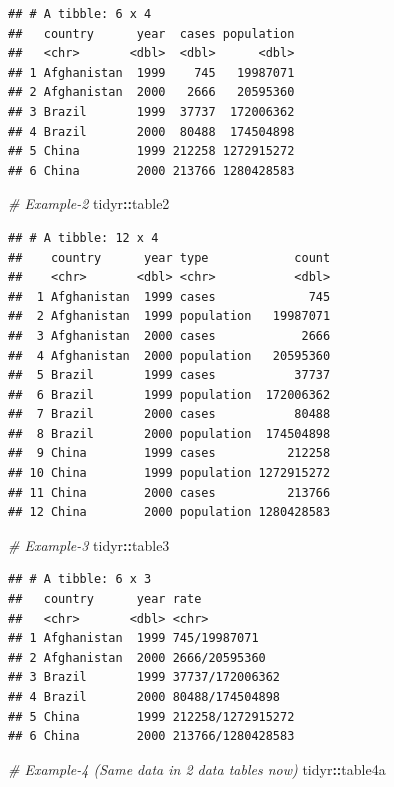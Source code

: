 \documentclass[
]{book}
\newenvironment{Shaded}{\begin{snugshade}}{\end{snugshade}}
\newcommand{\CommentTok}[1]{\textcolor[rgb]{0.56,0.35,0.01}{\textit{#1}}}
\newcommand{\NormalTok}[1]{#1}
\newcommand{\SpecialCharTok}[1]{\textcolor[rgb]{0.81,0.36,0.00}{\textbf{#1}}}
\begin{document}
\begin{verbatim}
## # A tibble: 6 x 4
##   country      year  cases population
##   <chr>       <dbl>  <dbl>      <dbl>
## 1 Afghanistan  1999    745   19987071
## 2 Afghanistan  2000   2666   20595360
## 3 Brazil       1999  37737  172006362
## 4 Brazil       2000  80488  174504898
## 5 China        1999 212258 1272915272
## 6 China        2000 213766 1280428583
\end{verbatim}

\begin{Shaded}
\begin{Highlighting}[]
\CommentTok{\# Example{-}2}
\NormalTok{tidyr}\SpecialCharTok{::}\NormalTok{table2}
\end{Highlighting}
\end{Shaded}

\begin{verbatim}
## # A tibble: 12 x 4
##    country      year type            count
##    <chr>       <dbl> <chr>           <dbl>
##  1 Afghanistan  1999 cases             745
##  2 Afghanistan  1999 population   19987071
##  3 Afghanistan  2000 cases            2666
##  4 Afghanistan  2000 population   20595360
##  5 Brazil       1999 cases           37737
##  6 Brazil       1999 population  172006362
##  7 Brazil       2000 cases           80488
##  8 Brazil       2000 population  174504898
##  9 China        1999 cases          212258
## 10 China        1999 population 1272915272
## 11 China        2000 cases          213766
## 12 China        2000 population 1280428583
\end{verbatim}

\begin{Shaded}
\begin{Highlighting}[]
\CommentTok{\# Example{-}3}
\NormalTok{tidyr}\SpecialCharTok{::}\NormalTok{table3}
\end{Highlighting}
\end{Shaded}

\begin{verbatim}
## # A tibble: 6 x 3
##   country      year rate             
##   <chr>       <dbl> <chr>            
## 1 Afghanistan  1999 745/19987071     
## 2 Afghanistan  2000 2666/20595360    
## 3 Brazil       1999 37737/172006362  
## 4 Brazil       2000 80488/174504898  
## 5 China        1999 212258/1272915272
## 6 China        2000 213766/1280428583
\end{verbatim}

\begin{Shaded}
\begin{Highlighting}[]
\CommentTok{\# Example{-}4 (Same data in 2 data tables now)}
\NormalTok{tidyr}\SpecialCharTok{::}\NormalTok{table4a}
\end{Highlighting}
\end{Shaded}
\end{document}
